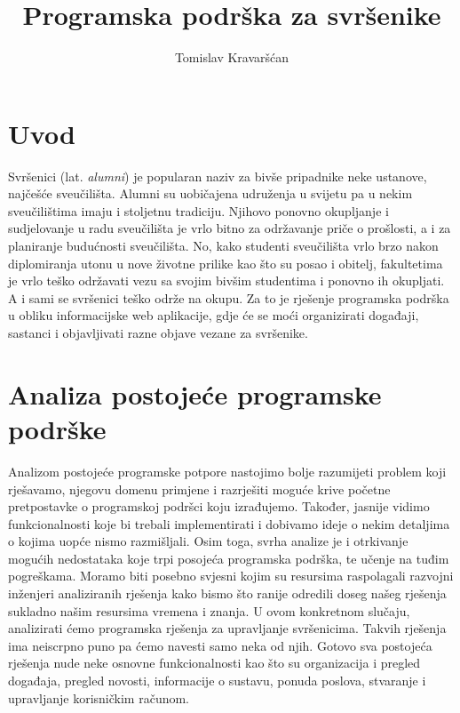 \documentclass[zavrsni, numeric]{fer}
\begin{document}

\title{Programska podrška za svršenike}

\author{Tomislav Kravaršćan}

\maketitle
 
\tableofcontents

\chapter{Uvod}
Svršenici (lat. \textit{alumni}) je popularan naziv za bivše pripadnike neke ustanove, najčešće sveučilišta. Alumni su uobičajena udruženja u svijetu pa u nekim sveučilištima imaju i stoljetnu tradiciju. Njihovo ponovno okupljanje i sudjelovanje u radu sveučilišta je vrlo bitno za održavanje priče o prošlosti, a i za planiranje budućnosti sveučilišta. No, kako studenti sveučilišta vrlo brzo nakon diplomiranja utonu u nove životne prilike kao što su posao i obitelj, fakultetima je vrlo teško održavati vezu sa svojim bivšim studentima i ponovno ih okupljati. A i sami se svršenici teško održe na okupu. Za to je rješenje programska podrška u obliku informacijske web aplikacije, gdje će se moći organizirati događaji, sastanci i objavljivati razne objave vezane za svršenike.

\chapter{Analiza postojeće programske podrške}
Analizom postojeće programske potpore nastojimo bolje razumijeti problem koji rješavamo, njegovu domenu primjene i razrješiti moguće krive početne pretpostavke o programskoj podršci koju izrađujemo. Također, jasnije vidimo funkcionalnosti koje bi trebali implementirati i dobivamo ideje o nekim detaljima o kojima uopće nismo razmišljali. Osim toga, svrha analize je i otrkivanje mogućih nedostataka koje trpi posojeća programska podrška, te učenje na tuđim pogreškama. Moramo biti posebno svjesni kojim su resursima raspolagali razvojni inženjeri analiziranih rješenja kako bismo što ranije odredili doseg našeg rješenja sukladno našim resursima vremena i znanja.
U ovom konkretnom slučaju, analizirati ćemo programska rješenja za upravljanje svršenicima. Takvih rješenja ima neiscrpno puno pa ćemo navesti samo neka od njih. Gotovo sva postojeća rješenja nude neke osnovne funkcionalnosti kao što su organizacija i pregled događaja, pregled novosti, informacije o sustavu, ponuda poslova, stvaranje i upravljanje korisničkim računom.
\end{document}
